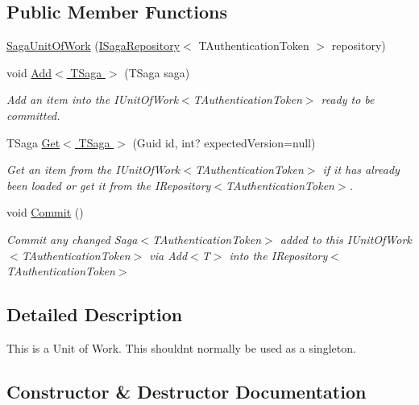 \subsection*{Public Member Functions}
\begin{DoxyCompactItemize}
\item 
\hyperlink{classCqrs_1_1Domain_1_1SagaUnitOfWork_ae2340d3bc97745c71d4854cb24115e93}{Saga\+Unit\+Of\+Work} (\hyperlink{interfaceCqrs_1_1Domain_1_1ISagaRepository}{I\+Saga\+Repository}$<$ T\+Authentication\+Token $>$ repository)
\item 
void \hyperlink{classCqrs_1_1Domain_1_1SagaUnitOfWork_af62fee98e76ec58ec4d684b36eb7b20e}{Add$<$ T\+Saga $>$} (T\+Saga saga)
\begin{DoxyCompactList}\small\item\em Add an item into the I\+Unit\+Of\+Work$<$\+T\+Authentication\+Token$>$ ready to be committed. \end{DoxyCompactList}\item 
T\+Saga \hyperlink{classCqrs_1_1Domain_1_1SagaUnitOfWork_acebe159e3b27e36a91909e97cf37d28d}{Get$<$ T\+Saga $>$} (Guid id, int? expected\+Version=null)
\begin{DoxyCompactList}\small\item\em Get an item from the I\+Unit\+Of\+Work$<$\+T\+Authentication\+Token$>$ if it has already been loaded or get it from the I\+Repository$<$\+T\+Authentication\+Token$>$. \end{DoxyCompactList}\item 
void \hyperlink{classCqrs_1_1Domain_1_1SagaUnitOfWork_aed2756dadfe0a0903a791944d02c4db8}{Commit} ()
\begin{DoxyCompactList}\small\item\em Commit any changed Saga$<$\+T\+Authentication\+Token$>$ added to this I\+Unit\+Of\+Work$<$\+T\+Authentication\+Token$>$ via Add$<$\+T$>$ into the I\+Repository$<$\+T\+Authentication\+Token$>$ \end{DoxyCompactList}\end{DoxyCompactItemize}


\subsection{Detailed Description}
This is a Unit of Work. This shouldn\textquotesingle{}t normally be used as a singleton. 



\subsection{Constructor \& Destructor Documentation}
\mbox{\label{classCqrs_1_1Domain_1_1SagaUnitOfWork_ae2340d3bc97745c71d4854cb24115e93}} 
